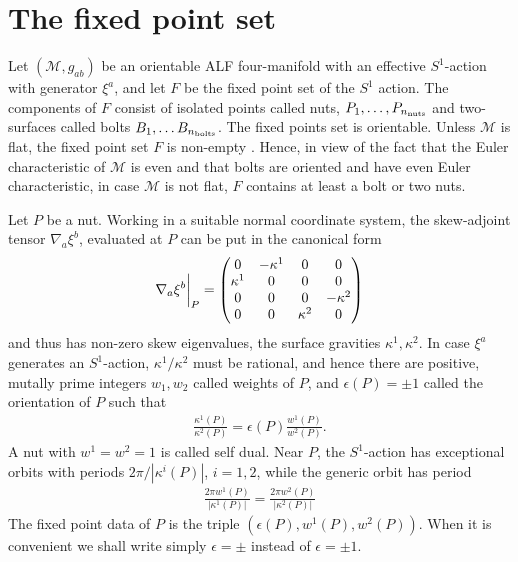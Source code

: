 \documentclass[a4paper,11pt,reqno]{amsart}
\newcommand{\nut}{P}
\newcommand{\bolt}{B}
\newcommand{\cM}{\mathcal{M}}
\theoremstyle{plain}
\newcommand{\nnuts}{n_{\text{\rm nuts}}}
\newcommand{\nbolts}{n_{\text{\rm bolts}}}
\numberwithin{equation}{section}
\newcommand{\eps}{\epsilon}
\newcommand{\Fixed}{F}
\begin{document}
\section{The fixed point set}
\label{sec:S1ALF} 
Let $(\cM, g_{ab})$ be an orientable ALF  four-manifold with an effective $S^1$-action with generator $\xi^a$, and let $\Fixed$ be the fixed point set of the $S^1$ action.  The components of $\Fixed$ consist of isolated points called nuts, $\nut_1, \dots, \nut_{\nnuts}$ and two-surfaces called  bolts $\bolt_1, \dots \bolt_{\nbolts}$.  The fixed points set is orientable. 
Unless $\cM$  is flat, the fixed point set $\Fixed$ is non-empty \cite{MR3973911}. Hence, in view of the fact that the Euler characteristic of $\cM$ is even and that bolts are oriented and have even Euler characteristic,  in case $\cM$ is not flat, $\Fixed$ contains at least a bolt or two nuts. 

Let $\nut$ be a nut. Working in a suitable normal coordinate system, the skew-adjoint tensor $\nabla_a \xi^b$, 
evaluated at $\nut$ can be put in the canonical form  
\begin{align} \label{eq:nablaxi(nut)}
\nabla_a \xi^b \bigg{|}_{\nut} = \begin{pmatrix}0&-\kappa^1&0&0\\\kappa^1&0&0&0\\0&0&0&-\kappa^2\\0&0&\kappa^2&0\end{pmatrix}
\end{align} 
and thus has non-zero skew eigenvalues, the surface gravities $\kappa^1, \kappa^2$.  
In case $\xi^a$ generates an $S^1$-action, $\kappa^1/\kappa^2$ must be rational, and hence there are  positive, mutally prime integers $w_1, w_2$ called weights of $\nut$, and $\eps(\nut) = \pm 1$ called the orientation of $\nut$ such that    
\begin{align} 
\frac{\kappa^1(\nut)}{\kappa^2(\nut)} = \eps(\nut) \frac{w^1(\nut)}{w^2(\nut)} .
\end{align} 
A nut with $w^1=w^2=1$ is called self dual. 
Near $\nut$, the $S^1$-action has exceptional orbits with periods $2\pi/|\kappa^i(\nut)|$, $i=1,2$, while the generic orbit has period 
\begin{align} 
\frac{2\pi w^1(\nut)}{|\kappa^1(\nut)|} = \frac{2 \pi w^2(\nut)}{|\kappa^2(\nut)|}
\end{align}  
The fixed point data of $\nut$ is the triple $(\eps(\nut), w^1(\nut), w^2(\nut))$. When it is convenient we shall write simply $\eps=\pm$ instead of $\eps=\pm 1$. 
\end{document}
